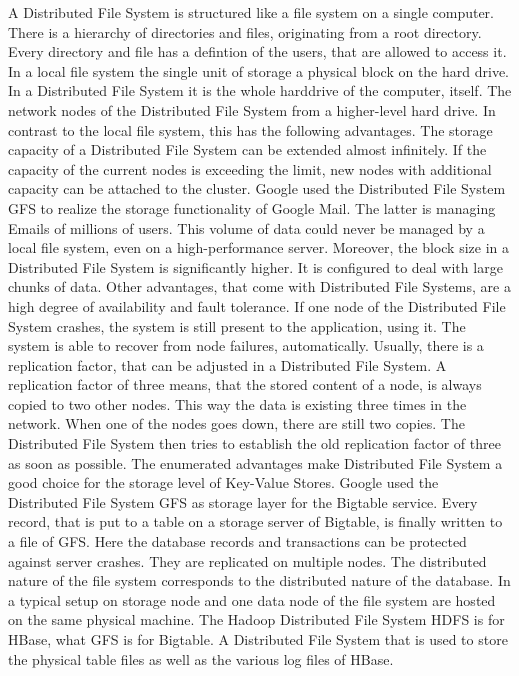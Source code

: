 \documentclass[11pt,a4paper,bibtotoc,idxtotoc,headsepline,footsepline,footexclude,BCOR12mm,DIV13]{scrbook}
\begin{document}
A Distributed File System is structured like a file system on a single computer. There is a hierarchy of directories and files, originating from a root directory. Every directory and file has a defintion of the users, that are allowed to access it. In a local file system the single unit of storage a physical block on the hard drive. In a Distributed File System it is the whole harddrive of the computer, itself. The network nodes of the Distributed File System from a higher-level hard drive. In contrast to the local file system, this has the following advantages. The storage capacity of a Distributed File System can be extended almost infinitely. If the capacity of the current nodes is exceeding the limit, new nodes with additional capacity can be attached to the cluster. Google used the Distributed File System GFS to realize the storage functionality of Google Mail. The latter is managing Emails of millions of users. This volume of data could never be managed by a local file system, even on a high-performance server. Moreover, the block size in a Distributed File System is significantly higher. It is configured to deal with large chunks of data. Other advantages, that come with Distributed File Systems, are a high degree of availability and fault tolerance. If one node of the Distributed File System crashes, the system is still present to the application, using it. The system is able to recover from node failures, automatically. Usually, there is a replication factor, that can be adjusted in a Distributed File System. A replication factor of three means, that the stored content of a node, is always copied to two other nodes. This way the data is existing three times in the network. When one of the nodes goes down, there are still two copies. The Distributed File System then tries to establish the old replication factor of three as soon as possible.
The enumerated advantages make Distributed File System a good choice for the storage level of Key-Value Stores. Google used the Distributed File System GFS as storage layer for the Bigtable service. Every record, that is put to a table on a storage server of Bigtable, is finally written to a file of GFS. Here the database records and transactions can be protected against server crashes. They are replicated on multiple nodes. The distributed nature of the file system corresponds to the distributed nature of the database. In a typical setup on storage node and one data node of the file system are hosted on the same physical machine. The Hadoop Distributed File System HDFS is for HBase, what GFS is for Bigtable. A Distributed File System that is used to store the physical table files as well as the various log files of HBase. 
\end{document}
